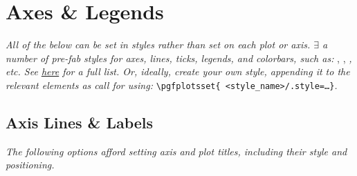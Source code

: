 
\section{Axes \& Legends}

\textit{All of the below can be set in styles rather than set on each plot or axis. $\exists$ a number of pre-fab styles for axes, lines, ticks, legends, and colorbars, such as: }\href{\docurl\#pgfp./pgfplots/every:major:tick}{}, \href{\docurl\#pgfp./pgfplots/title:style}{}, \href{\docurl\#pgfp./pgfplots/every:loglog:axis}{}\textit{, etc. See \href{\docurl\#pgfp./pgfplots/every:axis}{\ul{here}} for a full list. Or, ideally, create your own style, appending it to the relevant elements as call for using: }\texttt{\textbackslash pgfplotsset\{ <style\_name>/.style=\dots\}}\textit{.}



\subsection*{Axis Lines \& Labels}

\textit{The following options afford setting axis and plot titles, including their style and positioning.}

